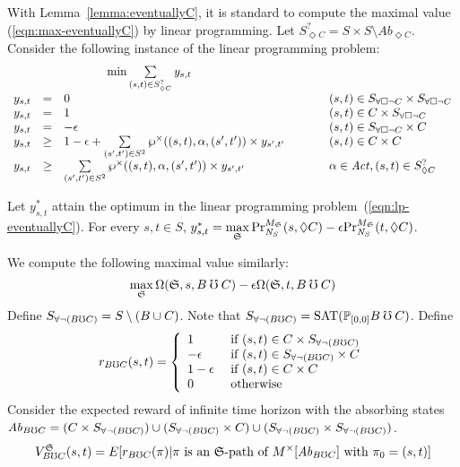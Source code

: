 With Lemma~\ref{lemma:eventuallyC}, it is standard to compute
the maximal value (\ref{eqn:max-eventuallyC}) by linear programming.
Let ${S}^{?}_{\Diamond C} = S \times S \setminus
\mathit{Ab}_{\Diamond C}$. Consider the following
instance of the linear programming problem:
\begin{eqnarray}
  \label{eqn:lp-eventuallyC}
\begin{array}{rclll}
  \multicolumn{3}{c}{
  \min \sum\limits_{(s, t) \in {S}^{?}_{\Diamond C}} y_{s, t}
  }\\
  y_{s, t} & = & 0 & \hspace{.05\columnwidth} &
  (s, t) \in \neverC \times \neverC\\
  y_{s, t} & = & 1 & &
  (s, t) \in C \times \neverC\\
  y_{s, t} & = & - \epsilon & &
  (s, t) \in \neverC \times C\\
  y_{s, t} & \geq & 1 - \epsilon +
  \sum\limits_{(s', t') \in S^2}
   \wp^{\times} ((s, t), \alpha, (s', t')) \times y_{s', t'} & &
  (s, t) \in C \times C\\
  y_{s, t} &\geq & \sum\limits_{(s', t') \in
  S^2}
   \wp^{\times} ((s, t), \alpha, (s', t')) \times y_{s', t'}
  & &
  \alpha \in \Act, (s, t) \in {S}^{?}_{\Diamond C}
\end{array}
\end{eqnarray}

\begin{theorem}
  Let $y^*_{s, t}$ attain the optimum
  in the linear programming problem~(\ref{eqn:lp-eventuallyC}). For
  every $s, t \in S$,
  $y^*_{s, t} = \max\limits_{\scheduler{S}}
  \myPr{s}{M_{\scheduler{S}}}{\neighbor{S}}{\gF C} -
  \epsilon \myPr{t}{M_{\scheduler{S}}}{\neighbor{S}}{\gF C}$.
  \label{theorem:eventuallyC}
\end{theorem}

We compute the following maximal value similarly:
\begin{eqnarray}
  \label{eqn:max-BuntilC}
  \max_{\scheduler{S}}
  \pPr{\scheduler{S}}{s}{B \guntil C} -
  \epsilon \pPr{\scheduler{S}}{t}{B \guntil C}
\end{eqnarray}
Define $\neverBuntilC = S \setminus (B \cup C)$. Note that
$\neverBuntilC = \textmd{SAT}(\PJ{[0,0]} B \guntil C)$.
Define
\[
r_{B \guntil C} (s, t) =
\left\{
  \begin{array}{ll}
    1 & \textmd{ if } (s, t) \in C \times \neverBuntilC\\
    -\epsilon & \textmd{ if } (s, t) \in \neverBuntilC \times C\\
    1 - \epsilon & \textmd{ if } (s, t) \in C \times C\\
    0 & \textmd{ otherwise}
  \end{array}
\right.
\]
Consider the expected reward of
infinite time horizon with the
absorbing states $\mathit{Ab}_{B \guntil C} = (C \times
\neverBuntilC) \cup (\neverBuntilC \times C) \cup (\neverBuntilC \times
\neverBuntilC)$.
\[
V^{\scheduler{S}}_{B \guntil C}(s, t) = E[ r_{B \guntil C} (\pi) | \pi
\textmd{ is an $\scheduler{S}$-path of }
{M}^{\times}[\mathit{Ab}_{B \guntil C}] \textmd{ with } \pi_0 = (s, t) ]
\]

